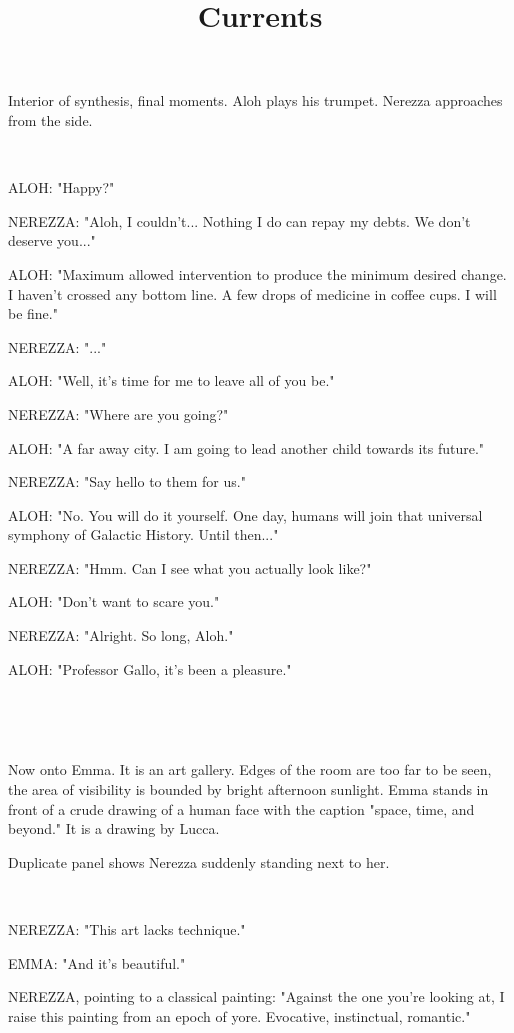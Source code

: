 \documentclass[11pt]{article}
\begin{document}
\ttfamily
\title{Currents}
\maketitle

Interior of synthesis, final moments.
Aloh plays his trumpet.
Nerezza approaches from the side.

\ 

ALOH: "Happy?"

NEREZZA: "Aloh, I couldn't... 
Nothing I do can repay my debts.
We don't deserve you..."

ALOH: "Maximum allowed intervention to produce the minimum desired change.
I haven't crossed any bottom line. 
A few drops of medicine in coffee cups.
I will be fine."

NEREZZA: "..."

ALOH: "Well, it's time for me to leave all of you be."

NEREZZA: "Where are you going?"

ALOH: "A far away city. I am going to lead another child towards its future."

NEREZZA: "Say hello to them for us."

ALOH: "No. You will do it yourself.
One day, humans will join that universal symphony of Galactic History.
Until then..."

NEREZZA: "Hmm. Can I see what you actually look like?"

ALOH: "Don't want to scare you."

NEREZZA: "Alright. So long, Aloh."

ALOH: "Professor Gallo, it's been a pleasure."

\ 

\ 

Now onto Emma.
It is an art gallery. 
Edges of the room are too far to be seen, the area of visibility is bounded by bright afternoon sunlight.
Emma stands in front of a crude drawing of a human face with the caption "space, time, and beyond."
It is a drawing by Lucca.

Duplicate panel shows Nerezza suddenly standing next to her.

\ 

NEREZZA: "This art lacks technique."

EMMA: "And it's beautiful."

NEREZZA, pointing to a classical painting: "Against the one you're looking at, I raise this painting from an epoch of yore. 
Evocative, instinctual, romantic."
\end{document}
